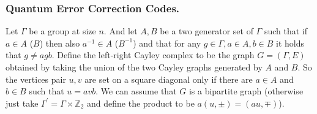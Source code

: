 \documentclass[usenames, aspectratio=169]{beamer}
\begin{document}
\begin{frame}
  \frametitle{ Quantum Error Correction Codes. }
\begin{definition}

%
%
%
  Let $\Gamma$ be a group at size $n$. And let $A,B$ be a two generator set of $\Gamma$ such that if $a \in A$ ($B$) then also $a^{-1}\in A$ ($B^{-1}$) and that for any $g\in \Gamma, a \in A, b \in B$ it holds that $g \neq agb$. Define the left-right Cayley complex to be the graph $G = \left( \Gamma, E \right)$ obtained by taking the union of the two Cayley graphs generated by $A$ and $B$. So the vertices pair $u,v$ are set on a square diagonal only if there are $a\in A$ and $b \in B$ such that $u = avb$. We can assume that $G$ is a bipartite graph (otherwise just take $\Gamma^{\prime} = \Gamma \times \mathbb{Z}_{2}$ and define the product to be $a\left( u,\pm \right) = \left( au, \mp \right)$).
\end{definition}
\end{frame}
\end{document}
